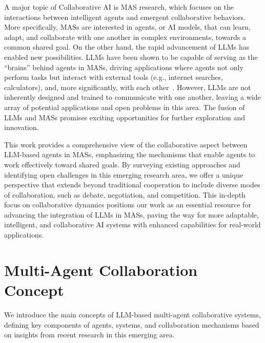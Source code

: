 \documentclass[acmsmall,nonacm]{acmart}
\begin{document}
        A major topic of Collaborative AI is MAS research, which focuses on the interactions between intelligent agents and emergent collaborative behaviors. More specifically, MASs are interested in agents, or AI models, that can learn, adapt, and collaborate with one another in complex environments, towards a common shared goal. On the other hand, the rapid advancement of LLMs has enabled new possibilities. LLMs have been shown to be capable of serving as the ``brains'' behind agents in MASs, driving applications where agents not only perform tasks but interact with external tools (e.g., internet searches, calculators), and, more significantly, with each other~\cite{ijcai2024p890}. However, LLMs are not inherently designed and trained to communicate with one another, leaving a wide array of potential applications and open problems in this area. The fusion of LLMs and MASs promises exciting opportunities for further exploration and innovation.
        
        This work provides a comprehensive view of the collaborative aspect between LLM-based agents in MASs, emphasizing the mechanisms that enable agents to work effectively toward shared goals. By surveying existing approaches and identifying open challenges in this emerging research area, we offer a unique perspective that extends beyond traditional cooperation to include diverse modes of collaboration, such as debate, negotiation, and competition. This in-depth focus on collaborative dynamics positions our work as an essential resource for advancing the integration of LLMs in MASs, paving the way for more adaptable, intelligent, and collaborative AI systems with enhanced capabilities for real-world applications.

\section{Multi-Agent Collaboration Concept} \label{sec:Prelim}
    We introduce the main concepts of LLM-based multi-agent collaborative systems, defining key components of agents, systems, and collaboration mechanisms based on insights from recent research in this emerging area.
\end{document}
